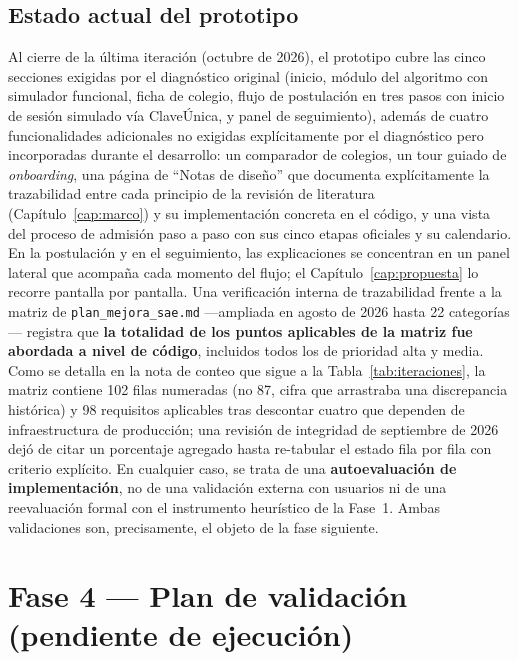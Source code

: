 \subsection{Estado actual del prototipo}

Al cierre de la última iteración (octubre de 2026), el prototipo cubre las cinco secciones exigidas por el diagnóstico original (inicio, módulo del algoritmo con simulador funcional, ficha de colegio, flujo de postulación en tres pasos con inicio de sesión simulado vía ClaveÚnica, y panel de seguimiento), además de cuatro funcionalidades adicionales no exigidas explícitamente por el diagnóstico pero incorporadas durante el desarrollo: un comparador de colegios, un tour guiado de \emph{onboarding}, una página de ``Notas de diseño'' que documenta explícitamente la trazabilidad entre cada principio de la revisión de literatura (Capítulo~\ref{cap:marco}) y su implementación concreta en el código, y una vista del proceso de admisión paso a paso con sus cinco etapas oficiales y su calendario. En la postulación y en el seguimiento, las explicaciones se concentran en un panel lateral que acompaña cada momento del flujo; el Capítulo~\ref{cap:propuesta} lo recorre pantalla por pantalla. Una verificación interna de trazabilidad frente a la matriz de \texttt{plan\_mejora\_sae.md} —ampliada en agosto de 2026 hasta 22 categorías— registra que \textbf{la totalidad de los puntos aplicables de la matriz fue abordada a nivel de código}, incluidos todos los de prioridad alta y media. Como se detalla en la nota de conteo que sigue a la Tabla~\ref{tab:iteraciones}, la matriz contiene 102 filas numeradas (no 87, cifra que arrastraba una discrepancia histórica) y 98 requisitos aplicables tras descontar cuatro que dependen de infraestructura de producción; una revisión de integridad de septiembre de 2026 dejó de citar un porcentaje agregado hasta re-tabular el estado fila por fila con criterio explícito. En cualquier caso, se trata de una \textbf{autoevaluación de implementación}, no de una validación externa con usuarios ni de una reevaluación formal con el instrumento heurístico de la Fase~1. Ambas validaciones son, precisamente, el objeto de la fase siguiente.

\section{Fase 4 — Plan de validación (pendiente de ejecución)}\label{sec:validacion}

